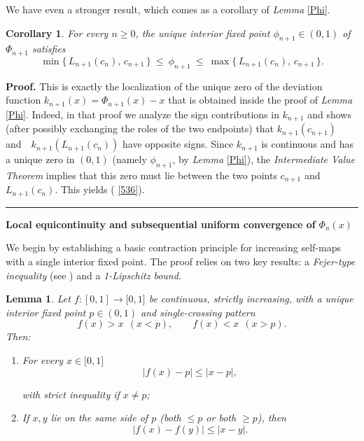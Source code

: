 \documentclass[onecolumn]{article}
\newtheorem{corollary}[theorem]{Corollary}
\newtheorem{lemma}[theorem]{Lemma}
\newenvironment{proof}[1][Proof]{\noindent\textbf{#1.} }{\ \rule{0.5em}{0.5em}}
\begin{document}
We have even a stronger result, which comes as a corollary of \textit{Lemma} %
\ref{Phi}.

\begin{corollary}
\label{Phi-strong-align} For every $n\geq 0$, the unique interior fixed
point $\phi _{n+1}\in (0,1)$ of $\Phi _{n+1}$ satisfies 
\begin{equation}
\min \{\,L_{n+1}(c_{n}),\,c_{n+1}\,\}\ \leq \ \phi _{n+1}\ \leq \ \max
\{\,L_{n+1}(c_{n}),\,c_{n+1}\,\}.  \label{536}
\end{equation}
\end{corollary}

\begin{proof}
\bigskip This is exactly the localization of the unique zero of the
deviation function $k_{n+1}(x)=\Phi _{n+1}(x)-x$ that is obtained inside the
proof of \textit{Lemma} \ref{Phi}. Indeed, in that proof we analyze the sign
contributions in $k_{n+1}$ and shows (after possibly exchanging the roles of
the two endpoints) that $k_{n+1}(c_{n+1})\quad $and$\quad
k_{n+1}(L_{n+1}(c_{n}))$ have opposite signs. Since $k_{n+1}$ is continuous
and has a unique zero in $(0,1)$ (namely $\phi _{n+1}$, by \textit{Lemma} %
\ref{Phi}), the \textit{Intermediate Value Theorem} implies that this zero
must lie between the two points $c_{n+1}$ and $L_{n+1}(c_{n})$. This yields (%
\ref{536}).
\end{proof}

\begin{flushleft}
\textbf{Local equicontinuity and subsequential uniform convergence of }$\Phi
_{n}(x)$
\end{flushleft}

We begin by establishing a basic contraction principle for increasing
self-maps with a single interior fixed point. The proof relies on two key
results: a \textit{Fejer-type inequality} (see \cite{[51]}) and a \textit{%
1-Lipschitz bound}.

\begin{lemma}
\label{Fejer} Let $f:[0,1]\rightarrow \lbrack 0,1]$ be continuous, strictly
increasing, with a unique interior fixed point $p\in (0,1)$ and
single-crossing pattern 
\begin{equation}
f(x)>x\ \ (x<p),\qquad f(x)<x\ \ (x>p).  \label{545}
\end{equation}%
Then:

\begin{enumerate}
\item For every $x\in \lbrack 0,1]$ 
\begin{equation}
|f(x)-p|\leq |x-p|,  \label{546}
\end{equation}

with strict inequality if $x\neq p$;

\item If $x,y$ lie on the same side of $p$ (both $\leq p$ or both $\geq p$),
then 
\begin{equation*}
|f(x)-f(y)|\leq |x-y|.
\end{equation*}
\end{enumerate}
\end{lemma}
\end{document}
